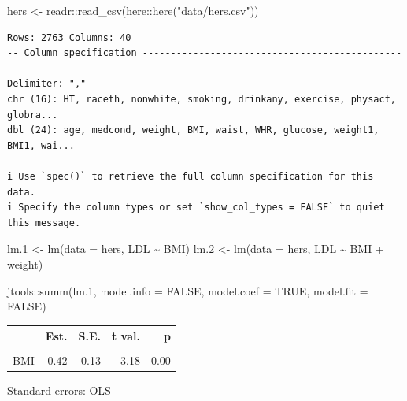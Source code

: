 \documentclass[
  letterpaper,
  DIV=11,
  numbers=noendperiod]{scrreport}
\newenvironment{Shaded}{\begin{snugshade}}{\end{snugshade}}
\newcommand{\AttributeTok}[1]{\textcolor[rgb]{0.40,0.45,0.13}{#1}}
\newcommand{\ConstantTok}[1]{\textcolor[rgb]{0.56,0.35,0.01}{#1}}
\newcommand{\FloatTok}[1]{\textcolor[rgb]{0.68,0.00,0.00}{#1}}
\newcommand{\FunctionTok}[1]{\textcolor[rgb]{0.28,0.35,0.67}{#1}}
\newcommand{\NormalTok}[1]{\textcolor[rgb]{0.00,0.23,0.31}{#1}}
\newcommand{\OtherTok}[1]{\textcolor[rgb]{0.00,0.23,0.31}{#1}}
\newcommand{\SpecialCharTok}[1]{\textcolor[rgb]{0.37,0.37,0.37}{#1}}
\newcommand{\StringTok}[1]{\textcolor[rgb]{0.13,0.47,0.30}{#1}}
\begin{document}
\begin{Shaded}
\begin{Highlighting}[]
\NormalTok{hers }\OtherTok{\textless{}{-}}\NormalTok{ readr}\SpecialCharTok{::}\FunctionTok{read\_csv}\NormalTok{(here}\SpecialCharTok{::}\FunctionTok{here}\NormalTok{(}\StringTok{"data/hers.csv"}\NormalTok{))}
\end{Highlighting}
\end{Shaded}

\begin{verbatim}
Rows: 2763 Columns: 40
-- Column specification --------------------------------------------------------
Delimiter: ","
chr (16): HT, raceth, nonwhite, smoking, drinkany, exercise, physact, globra...
dbl (24): age, medcond, weight, BMI, waist, WHR, glucose, weight1, BMI1, wai...

i Use `spec()` to retrieve the full column specification for this data.
i Specify the column types or set `show_col_types = FALSE` to quiet this message.
\end{verbatim}

\begin{Shaded}
\begin{Highlighting}[]
\NormalTok{lm}\FloatTok{.1} \OtherTok{\textless{}{-}} \FunctionTok{lm}\NormalTok{(}\AttributeTok{data =}\NormalTok{ hers, LDL }\SpecialCharTok{\textasciitilde{}}\NormalTok{ BMI)}
\NormalTok{lm}\FloatTok{.2} \OtherTok{\textless{}{-}} \FunctionTok{lm}\NormalTok{(}\AttributeTok{data =}\NormalTok{ hers, LDL }\SpecialCharTok{\textasciitilde{}}\NormalTok{ BMI }\SpecialCharTok{+}\NormalTok{ weight)}

\NormalTok{jtools}\SpecialCharTok{::}\FunctionTok{summ}\NormalTok{(lm}\FloatTok{.1}\NormalTok{, }\AttributeTok{model.info =} \ConstantTok{FALSE}\NormalTok{, }\AttributeTok{model.coef =} \ConstantTok{TRUE}\NormalTok{, }\AttributeTok{model.fit =} \ConstantTok{FALSE}\NormalTok{)}
\end{Highlighting}
\end{Shaded}

\begin{table}[!h]
\centering
\begin{threeparttable}
\begin{tabular}{lrrrr}
\toprule
  & Est. & S.E. & t val. & p\\
\midrule
\cellcolor{gray!6}{(Intercept)} & \cellcolor{gray!6}{133.19} & \cellcolor{gray!6}{3.79} & \cellcolor{gray!6}{35.11} & \cellcolor{gray!6}{0.00}\\
BMI & 0.42 & 0.13 & 3.18 & 0.00\\
\bottomrule
\end{tabular}
\begin{tablenotes}
\item Standard errors: OLS
\end{tablenotes}
\end{threeparttable}
\end{table}
\end{document}
